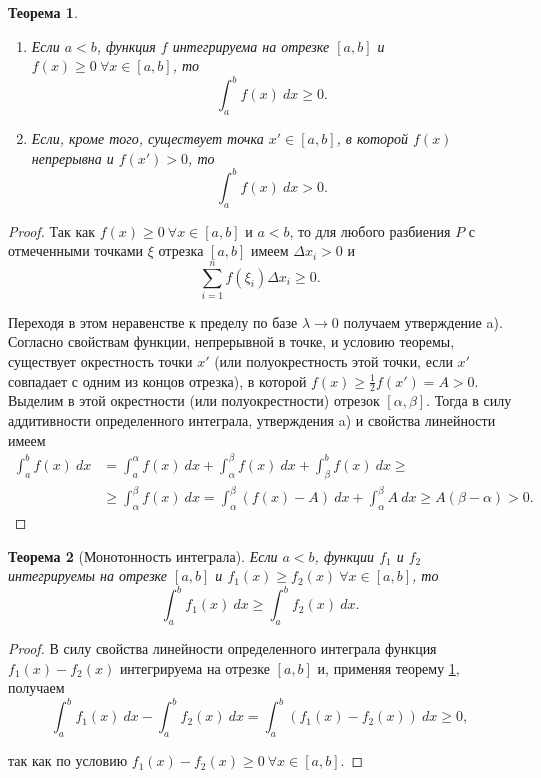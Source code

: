 \documentclass[12pt]{report}
\numberwithin{equation}{section}
\newtheorem{theorem}{Теорема}[section]
\begin{document}
\begin{theorem} \label{th:8:1}
~\\ %
\begin{enumerate}
    \item[a)] Если $a < b$, функция $f$ интегрируема на отрезке $[a,b]$ и $f(x) \geqslant 0~ \forall x \in [a,b]$, то
    \[ \int_a^b f(x)~dx \geqslant 0.\]
    \item[b)] Если, кроме того, существует точка $x' \in [a,b]$, в которой $f(x)$ непрерывна и $f(x') > 0$, то
    \[ \int_a^b f(x)~dx > 0.\]
\end{enumerate}
\end{theorem}
\begin{proof}
Так как $f(x) \geqslant 0 ~ \forall x \in [a,b]$ и $a < b$, то для любого разбиения $P$ с отмеченными точками $\xi$ отрезка $[a,b]$ имеем $\Delta x_i > 0$ и
\[ \sum_{i=1}^n f(\xi_i) \Delta x_i \geqslant 0. \]

Переходя в этом неравенстве к пределу по базе $\lambda \to 0$ получаем утверждение a).\\

Согласно свойствам функции, непрерывной в точке, и условию теоремы, существует окрестность точки $x'$ (или полуокрестность этой точки, если $x'$ совпадает с одним из концов отрезка), в которой $f(x) \geqslant \frac{1}{2} f(x') = A > 0$. Выделим в этой окрестности (или полуокрестности) отрезок $[\alpha, \beta]$. Тогда в силу аддитивности определенного интеграла, утверждения a) и свойства линейности имеем
\[ 
\begin{aligned}
\int_a^b f(x)~dx &= \int_a^{\alpha} f(x)~dx + \int_{\alpha}^{\beta} f(x)~dx + \int_{\beta}^b f(x)~dx \geqslant\\
&\geqslant \int_{\alpha}^{\beta} f(x)~dx = \int_{\alpha}^{\beta} (f(x) - A)~dx + \int_{\alpha}^{\beta} A~dx \geqslant A(\beta - \alpha) > 0.
\end{aligned}
\]
\end{proof}
\begin{theorem}[Монотонность интеграла] \label{th:8:2}
Если $a < b$, функции $f_1$ и $f_2$ интегрируемы на отрезке $[a,b]$ и $f_1(x) \geqslant f_2(x) ~\forall x \in [a,b]$, то 
\[ \int_a^{b} f_1(x)~dx \geqslant \int_a^b f_2(x)~dx.\]
\end{theorem}
\begin{proof}
В силу свойства линейности определенного интеграла функция $f_1(x) - f_2(x)$ интегрируема на отрезке $[a,b]$ и, применяя теорему \ref{th:8:1}, получаем
\[ \int_a^b f_1(x)~dx - \int_a^b f_2 (x)~dx = \int_a^b (f_1(x) - f_2(x))~dx \geqslant 0,\]

так как по условию $f_1(x) - f_2(x) \geqslant 0~\forall x \in [a,b]$.
\end{proof}
\end{document}
